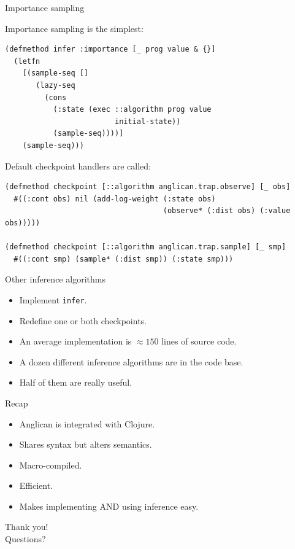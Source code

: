 \documentclass{beamer}
\begin{document}
\begin{frame}[fragile]{Importance sampling}

Importance sampling is the simplest:
\begin{verbatim}
(defmethod infer :importance [_ prog value & {}]
  (letfn
    [(sample-seq []
       (lazy-seq
         (cons
           (:state (exec ::algorithm prog value
                         initial-state))
           (sample-seq))))]
    (sample-seq)))
\end{verbatim}
Default checkpoint handlers are called:
\begin{verbatim}
(defmethod checkpoint [::algorithm anglican.trap.observe] [_ obs]
  #((:cont obs) nil (add-log-weight (:state obs)
                                    (observe* (:dist obs) (:value obs)))))

(defmethod checkpoint [::algorithm anglican.trap.sample] [_ smp]
  #((:cont smp) (sample* (:dist smp)) (:state smp)))
\end{verbatim}
\end{frame}

\begin{frame}{Other inference algorithms}
    \begin{itemize}
        \item Implement \texttt{infer}.
        \item Redefine one or both checkpoints.
        \item An average implementation is $\approx 150$ lines of source
            code.
        \item A dozen different inference algorithms are in the
            code base.
        \item Half of them are really useful.
    \end{itemize}
\end{frame}

\begin{frame}{Recap}
    \begin{itemize}
        \item Anglican is integrated with Clojure.
        \item Shares syntax but alters semantics.
        \item Macro-compiled.
        \item Efficient.
        \item Makes implementing AND using inference easy.
    \end{itemize}
\end{frame}

\begin{frame}
    \LARGE
    \center
    Thank you!\\Questions?
\end{frame}
\end{document}
